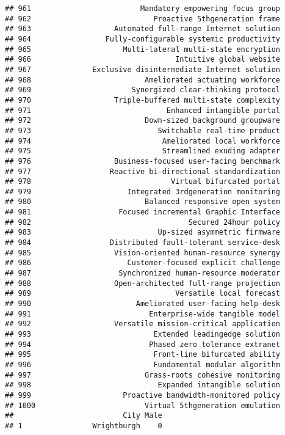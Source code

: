 \documentclass[
]{article}
\begin{document}
\begin{verbatim}
## 961                         Mandatory empowering focus group
## 962                            Proactive 5thgeneration frame
## 963                   Automated full-range Internet solution
## 964                 Fully-configurable systemic productivity
## 965                     Multi-lateral multi-state encryption
## 966                                 Intuitive global website
## 967              Exclusive disintermediate Internet solution
## 968                          Ameliorated actuating workforce
## 969                       Synergized clear-thinking protocol
## 970                   Triple-buffered multi-state complexity
## 971                               Enhanced intangible portal
## 972                          Down-sized background groupware
## 973                             Switchable real-time product
## 974                              Ameliorated local workforce
## 975                              Streamlined exuding adapter
## 976                   Business-focused user-facing benchmark
## 977                  Reactive bi-directional standardization
## 978                                Virtual bifurcated portal
## 979                      Integrated 3rdgeneration monitoring
## 980                          Balanced responsive open system
## 981                    Focused incremental Graphic Interface
## 982                                    Secured 24hour policy
## 983                             Up-sized asymmetric firmware
## 984                  Distributed fault-tolerant service-desk
## 985                   Vision-oriented human-resource synergy
## 986                      Customer-focused explicit challenge
## 987                    Synchronized human-resource moderator
## 988                   Open-architected full-range projection
## 989                                 Versatile local forecast
## 990                        Ameliorated user-facing help-desk
## 991                           Enterprise-wide tangible model
## 992                   Versatile mission-critical application
## 993                            Extended leadingedge solution
## 994                           Phased zero tolerance extranet
## 995                            Front-line bifurcated ability
## 996                            Fundamental modular algorithm
## 997                          Grass-roots cohesive monitoring
## 998                             Expanded intangible solution
## 999                     Proactive bandwidth-monitored policy
## 1000                         Virtual 5thgeneration emulation
##                         City Male
## 1                Wrightburgh    0

\end{verbatim}
\end{document}
